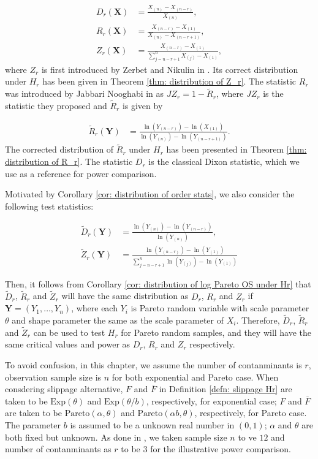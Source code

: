 \documentclass{report}
\begin{document}
\begin{align*}
    D_r(\mathbf X) &= \frac{X_{(n)} - X_{(n-r)}}{X_{(n)}},  \\
    R_r(\mathbf X) &= \frac{X_{(n-r)} - X_{(1)}}{X_{(n)} - X_{(n-r+1)}}, \\
    Z_r(\mathbf X) &= \frac{X_{(n-r)} -X_{(1)}}{\sum_{j = n - r + 1}^n X_{(j)} - X_{(1)}},
\end{align*}
where $Z_r$ is first introduced by Zerbet and Nikulin in \cite{zerbet2003new}. Its correct distribution under $H_r$ has been given in Theorem \ref{thm: distribution of Z_r}.
The statistic $R_r$ was introduced by Jabbari Nooghabi in \cite{jabbari2019detecting} as $J\!Z_r = 1- \tilde R_r$, where $J\!Z_r$ is the statistic they proposed and
$\tilde R_r$ is given by

\begin{align*}
    \tilde R_r(\mathbf Y)  &= \frac{\ln(Y_{(n-r)}) - \ln(X_{(1)})}{\ln(Y_{(n)}) - \ln(Y_{(n-r+1)})}.
\end{align*}
The corrected distribution of $\tilde R_r$ under $H_r$ has been presented in Theorem \ref{thm: distribution of R_r}. The statistic $D_r$ is the classical Dixon statistic, which
we use as a reference for power comparison.

Motivated by Corollary \ref{cor: distribution of order stats}, we also consider the following test statistics: 

\begin{align*}
   \tilde D_r(\mathbf Y) &= \frac{\ln(Y_{(n)}) - \ln(Y_{(n-r)})}{\ln(Y_{(n)})}, \label{eqn: modified Dr} \\
    \tilde Z_r(\mathbf Y) &= \frac{\ln(Y_{(n-r)}) -\ln(Y_{(1)})}{\sum_{j = n - r + 1}^n \ln(Y_{(j)}) - \ln(Y_{(1)})}
\end{align*}

Then, it follows from Corollary \ref{cor: distribution of log Pareto OS under Hr} that $\tilde D_r$, $\tilde R_r$ and $\tilde Z_r$ will have the same distribution
as $D_r$, $R_r$ and $Z_r$ if $\mathbf Y = (Y_1,\ldots, Y_n)$, where each $Y_i$ is Pareto random variable with scale parameter $\theta$
and shape parameter the same as the scale parameter of $X_i$. Therefore, $\tilde D_r$, $\tilde R_r$ and $\tilde Z_r$ can be used to
test $H_r$ for Pareto random samples, and they will have the same critical values and power as $D_r$, $R_r$ and $Z_r$ respectively.

To avoid confusion, in this chapter, we assume the number of contanminants is $r$, observation sample size is $n$
for both exponential and Pareto case. When consdering slippage alternative, $F$ and $\overline{F}$ in Definition \ref{defn: slippage Hr} are taken to be $\mathrm{Exp}(\theta)$
and $\mathrm{Exp}(\theta/b)$, respectively, for exponential case; $F$ and $\overline{F}$ are taken to be $\mathrm{Pareto}(\alpha, \theta)$
and $\mathrm{Pareto}(\alpha b, \theta)$, respectively, for Pareto case. The parameter $b$ is assumed to be a unknown real number in $(0,1)$;  $\alpha$ and $\theta$ are both fixed but unknown. 
As done in \cite{zerbet2003new}, we taken sample size $n$ to ve $12$ and number of contanminants as $r$ to be $3$ for the illustrative power comparison.
\end{document}
